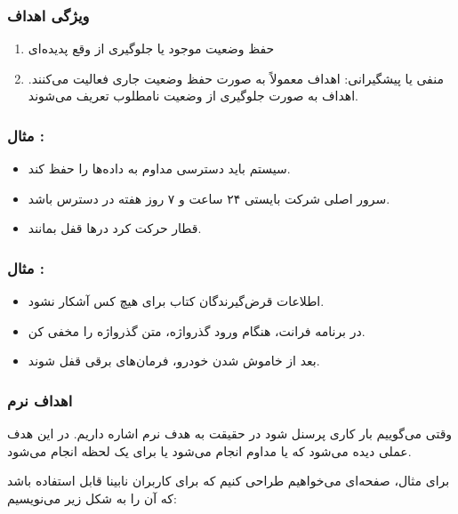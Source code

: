 \subsubsection*{ویژگی اهداف }

\begin{enumerate}
    \item حفظ وضعیت موجود یا جلوگیری از وقع پدیده‌ای
    \item منفی یا پیشگیرانی: اهداف  معمولاً به صورت حفظ وضعیت جاری
    فعالیت می‌کنند. اهداف  به صورت جلوگیری از وضعیت نامطلوب تعریف
    می‌شوند.
\end{enumerate}

\subsubsection*{مثال :}

\begin{itemize}
    \item سیستم باید دسترسی مداوم به داده‌ها را حفظ کند.
    \item سرور اصلی شرکت بایستی ۲۴ ساعت و ۷ روز هفته در دسترس باشد.
    \item قطار حرکت کرد در‌ها قفل بمانند.
\end{itemize}

\subsubsection*{مثال :}

\begin{itemize}
    \item اطلاعات قرض‌گیرندگان کتاب برای هیچ کس آشکار نشود.
    \item در برنامه فرانت، هنگام ورود گذرواژه، متن گذرواژه را مخفی کن.
    \item بعد از خاموش شدن خودرو، فرمان‌های برقی قفل شوند.
\end{itemize}

\subsubsection{اهداف نرم}

وقتی می‌گوییم بار کاری پرسنل  شود در حقیقت به هدف نرم اشاره داریم.
در این هدف عملی دیده می‌شود که یا مداوم انجام می‌شود یا برای یک لحظه انجام
می‌شود.

برای مثال، صفحه‌ای می‌خواهیم طراحی کنیم که برای کاربران نابینا قابل استفاده باشد
که آن را به شکل زیر می‌نویسیم:

